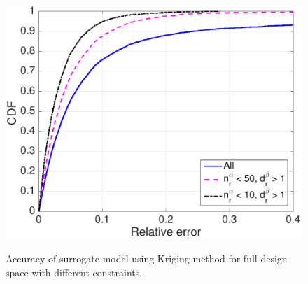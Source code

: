 
\begin{figure}[t]
    \centering
{\includegraphics[width=0.8\columnwidth]{figures/full_constraint}}
  \caption{Accuracy of surrogate model using Kriging method for full design space with different constraints. \label{fig:cdf_constraint}}
\end{figure}








